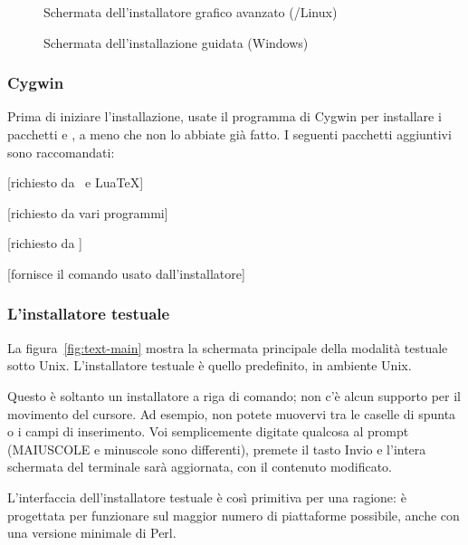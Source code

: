 \documentclass{article}
\begin{document}
\begin{figure}[tb]
\caption{Schermata dell'installatore grafico avanzato
  (\GNU/Linux)}\label{fig:gui-main}
\end{figure}

\begin{figure}[tb]
\caption{Schermata dell'installazione guidata
  (Windows)}\label{fig:wizard-w32}
\end{figure}


\subsubsection{Cygwin}
\label{sec:cygwin}

Prima di iniziare l'installazione, usate il programma 
di Cygwin per installare i pacchetti  e , a
meno che non lo abbiate già fatto. I seguenti pacchetti aggiuntivi sono
raccomandati:
\begin{itemize*}
\item {} [richiesto da \XeTeX\ e Lua\TeX]
\item {} [richiesto da vari programmi]
\item {} [richiesto da ]
\item {} [fornisce il comando  usato
  dall'installatore]
\end{itemize*}

\subsubsection{L'installatore testuale}

La figura~\ref{fig:text-main} mostra la schermata principale della
modalità testuale sotto Unix. L'installatore testuale è quello
predefinito, in ambiente Unix.

Questo è soltanto un installatore a riga di comando; non c'è alcun
supporto per il movimento del cursore. Ad esempio, non
potete muovervi tra le caselle di spunta o i campi di inserimento.
Voi semplicemente digitate qualcosa al prompt (MAIUSCOLE e minuscole sono
differenti), premete il tasto Invio e l'intera schermata del terminale
sarà aggiornata, con il contenuto modificato.

L'interfaccia dell'installatore testuale è così primitiva per una ragione:
è progettata per funzionare sul maggior numero di piattaforme possibile,
anche con una versione minimale di Perl.
\end{document}
